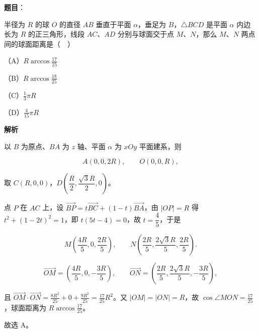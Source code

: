 \begin{answer}

\textbf{题目}：

半径为 $R$ 的球 $O$ 的直径 $AB$ 垂直于平面 $\alpha$，垂足为 $B$，$\triangle BCD$ 是平面 $\alpha$ 内边长为 $R$ 的正三角形，线段 $AC$、$AD$ 分别与球面交于点 $M$、$N$，那么 $M$、$N$ 两点间的球面距离是（　）
\nopagebreak[4]
\begin{center}\end{center}
\nopagebreak[4]
（A）$R\arccos\frac{17}{25}$

（B）$R\arccos\frac{18}{25}$

（C）$\frac{1}{3}\pi R$

（D）$\frac{4}{15}\pi R$

\textbf{解析}

以 $B$ 为原点、$BA$ 为 $z$ 轴、平面 $\alpha$ 为 $xOy$ 平面建系，则

\nopagebreak[4]
\[A(0,0,2R),\qquad O(0,0,R),\]

取 $C(R,0,0)$，$D\left(\dfrac R2,\dfrac{\sqrt3R}2,0\right)$。

点 $P$ 在 $AC$ 上，设 $\overrightarrow{BP}=t\overrightarrow{BC}+(1-t)\overrightarrow{BA}$，由 $|OP|=R$ 得 $t^2+\left(1-2t\right)^2=1$，即 $t\left(5t-4\right)=0$，故 $t=\dfrac45$，于是

\nopagebreak[4]
\[M\left(\frac{4R}5,0,\frac{2R}5\right),\qquad N\left(\frac{2R}5,\frac{2\sqrt3R}5,\frac{2R}5\right).\]

\nopagebreak[4]
\[\overrightarrow{OM}=\left(\frac{4R}5,0,-\frac{3R}5\right),\qquad \overrightarrow{ON}=\left(\frac{2R}5,\frac{2\sqrt3R}5,-\frac{3R}5\right),\]

且 $\overrightarrow{OM}\cdot\overrightarrow{ON}=\frac{8R^2}{25}+0+\frac{9R^2}{25}=\frac{17}{25}R^2$。又 $|OM|=|ON|=R$，故 $\cos\angle MON=\frac{17}{25}$，球面距离为 $R\arccos\frac{17}{25}$。

故选 A。


\end{answer}
